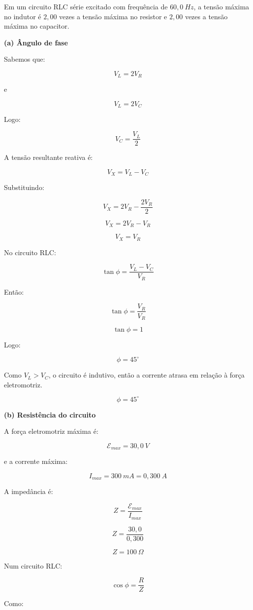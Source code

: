 \documentclass[12pt,a4paper]{article}
\begin{document}
Em um circuito RLC série excitado com frequência de \(60,0\ Hz\), a tensão máxima no indutor é \(2,00\) vezes a tensão máxima no resistor e \(2,00\) vezes a tensão máxima no capacitor.

\vspace{0.5cm}

\textbf{(a) Ângulo de fase}

Sabemos que:

\[
V_L=2V_R
\]

e

\[
V_L=2V_C
\]

Logo:

\[
V_C=\frac{V_L}{2}
\]

A tensão resultante reativa é:

\[
V_X=V_L-V_C
\]

Substituindo:

\[
V_X=2V_R-\frac{2V_R}{2}
\]

\[
V_X=2V_R-V_R
\]

\[
V_X=V_R
\]

No circuito RLC:

\[
\tan\phi=\frac{V_L-V_C}{V_R}
\]

Então:

\[
\tan\phi=\frac{V_R}{V_R}
\]

\[
\tan\phi=1
\]

Logo:

\[
\phi=45^\circ
\]

Como \(V_L>V_C\), o circuito é indutivo, então a corrente atrasa em relação à força eletromotriz.

\[
\phi=45^\circ
\]

\vspace{0.5cm}

\textbf{(b) Resistência do circuito}

A força eletromotriz máxima é:

\[
\mathcal{E}_{max}=30,0\ V
\]

e a corrente máxima:

\[
I_{max}=300\ mA=0,300\ A
\]

A impedância é:

\[
Z=\frac{\mathcal{E}_{max}}{I_{max}}
\]

\[
Z=\frac{30,0}{0,300}
\]

\[
Z=100\ \Omega
\]

Num circuito RLC:

\[
\cos\phi=\frac{R}{Z}
\]

Como:
\end{document}
